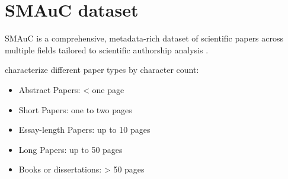 \section{SMAuC dataset}
\label{sec:smauc_dataset}

SMAuC is a comprehensive, metadata-rich dataset of scientific papers across multiple fields tailored to scientific authorship analysis \citep{bevendorff_smauc_2023}.

\citet{bevendorff_smauc_2023} characterize different paper types by character count:
\begin{itemize}
    \item Abstract Papers: < one page
    \item Short Papers: one to two pages
    \item Essay-length Papers: up to 10 pages
    \item Long Papers: up to 50 pages
    \item Books or dissertations: > 50 pages
\end{itemize}